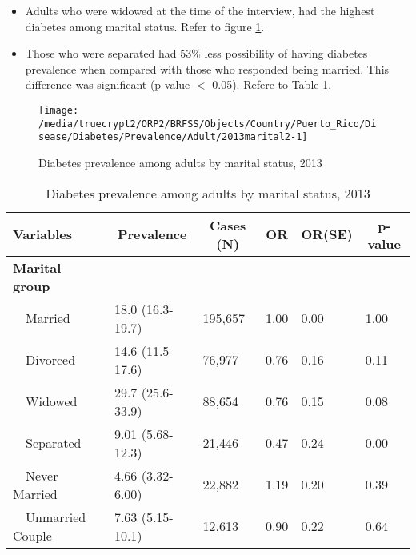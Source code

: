  \newpage
\begin{itemize}

\item Adults who were 
widowed at the time of the interview, had the highest diabetes among marital status. Refer to figure \ref{fig:marital.Diabetes.2013}.

\item Those who were separated had 53\% less possibility of having diabetes prevalence when compared with those who responded being married. This difference was significant (p-value $<$ 0.05). Refere to Table \ref{tab:marital.Diabetes.2013}.

\end{itemize}

\begin{figure}[H]
\caption{Diabetes prevalence among adults by marital status,
         2013}
\label{fig:marital.Diabetes.2013}
\begin{knitrout}
\color{fgcolor}

{\centering \texttt{[image: /media/truecrypt2/ORP2/BRFSS/Objects/Country/Puerto\_Rico/Disease/Diabetes/Prevalence/Adult/2013marital2-1]} 

}



\end{knitrout}
 \end{figure}

\begin{table}[H]
\caption{Diabetes prevalence  among adults by marital status, 2013\label{tab:marital.Diabetes.2013}} 
\begin{center}
\begin{tabular}{llllll}
\hline\hline
\multicolumn{1}{l}{Variables}&\multicolumn{1}{c}{Prevalence}&\multicolumn{1}{c}{Cases (N)}&\multicolumn{1}{c}{OR}&\multicolumn{1}{c}{OR(SE)}&\multicolumn{1}{c}{p-value}\tabularnewline
\hline
{\bfseries Marital group}&&&&&\tabularnewline
~~Married&18.0 (16.3-19.7)&195,657&1.00&0.00&1.00\tabularnewline
~~Divorced&14.6 (11.5-17.6)& 76,977&0.76&0.16&0.11\tabularnewline
~~Widowed&29.7 (25.6-33.9)& 88,654&0.76&0.15&0.08\tabularnewline
~~Separated&9.01 (5.68-12.3)& 21,446&0.47&0.24&0.00\tabularnewline
~~Never Married&4.66 (3.32-6.00)& 22,882&1.19&0.20&0.39\tabularnewline
~~Unmarried Couple&7.63 (5.15-10.1)& 12,613&0.90&0.22&0.64\tabularnewline
\hline
\end{tabular}\end{center}

\end{table}

